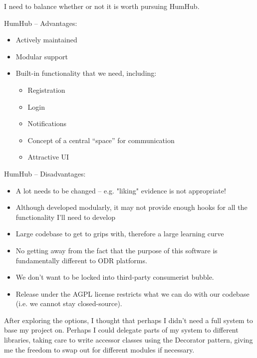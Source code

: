 I need to balance whether or not it is worth pursuing HumHub.

HumHub – Advantages:

\begin{itemize}
    \item Actively maintained
    \item Modular support
    \item Built-in functionality that we need, including:
    \begin{itemize}
        \item Registration
        \item Login
        \item Notifications
        \item Concept of a central “space” for communication
        \item Attractive UI
    \end{itemize}
\end{itemize}


HumHub – Disadvantages:

\begin{itemize}
    \item A lot needs to be changed – e.g. "liking" evidence is not appropriate!
    \item Although developed modularly, it may not provide enough hooks for all the functionality I'll need to develop
    \item Large codebase to get to grips with, therefore a large learning curve
    \item No getting away from the fact that the purpose of this software is fundamentally different to ODR platforms.
    \item We don't want to be locked into third-party consumerist bubble.
    \item Release under the AGPL license restricts what we can do with our codebase (i.e. we cannot stay closed-source).
\end{itemize}

After exploring the options, I thought that perhaps I didn't need a full system to base my project on. Perhaps I could delegate parts of my system to different libraries, taking care to write accessor classes using the Decorator pattern, giving me the freedom to swap out for different modules if necessary.